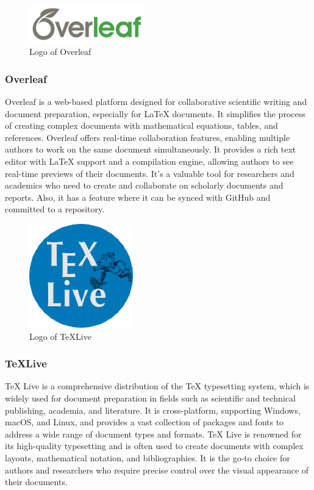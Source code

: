 \documentclass[conference]{IEEEtran}
\begin{document}
        \begin{figure}[htbp]
        \centerline{\includegraphics[width=5cm]{Images/logo/overleaf.png}}
        \label{fig}
        \caption{Logo of Overleaf}
        \end{figure}
        \subsubsection{Overleaf}
        Overleaf is a web-based platform designed for collaborative scientific writing and document preparation, especially for LaTeX documents. It simplifies the process of creating complex documents with mathematical equations, tables, and references. Overleaf offers real-time collaboration features, enabling multiple authors to work on the same document simultaneously. It provides a rich text editor with LaTeX support and a compilation engine, allowing authors to see real-time previews of their documents. It's a valuable tool for researchers and academics who need to create and collaborate on scholarly documents and reports. Also, it has a feature where it can be synced with GitHub and committed to a repository.\\

        \begin{figure}[htbp]
        \centerline{\includegraphics[width=4.5cm]{Images/logo/texlive.png}}
        \label{fig}
        \caption{Logo of TeXLive}
        \end{figure}
        \subsubsection{TeXLive}
        TeX Live is a comprehensive distribution of the TeX typesetting system, which is widely used for document preparation in fields such as scientific and technical publishing, academia, and literature. It is cross-platform, supporting Windows, macOS, and Linux, and provides a vast collection of packages and fonts to address a wide range of document types and formats. TeX Live is renowned for its high-quality typesetting and is often used to create documents with complex layouts, mathematical notation, and bibliographies. It is the go-to choice for authors and researchers who require precise control over the visual appearance of their documents.\\
\end{document}
